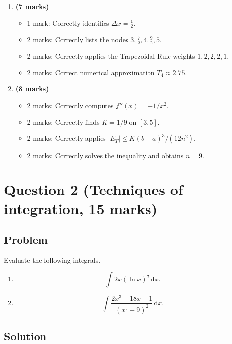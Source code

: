 \documentclass[12pt]{article}
\newcommand{\dd}{\,\mathrm{d}}
\begin{document}
\begin{enumerate}[label=(\alph*)]
\item \textbf{(7 marks)}
\begin{itemize}
\item 1 mark: Correctly identifies $\Delta x=\frac12$.
\item 2 marks: Correctly lists the nodes $3,\frac72,4,\frac92,5$.
\item 2 marks: Correctly applies the Trapezoidal Rule weights $1,2,2,2,1$.
\item 2 marks: Correct numerical approximation $T_4\approx 2.75$.
\end{itemize}

\item \textbf{(8 marks)}
\begin{itemize}
\item 2 marks: Correctly computes $f''(x)=-1/x^2$.
\item 2 marks: Correctly finds $K=1/9$ on $[3,5]$.
\item 2 marks: Correctly applies $|E_T|\le K(b-a)^3/(12n^2)$.
\item 2 marks: Correctly solves the inequality and obtains $n=9$.
\end{itemize}
\end{enumerate}


\newpage
\section{Question 2 (Techniques of integration, 15 marks)}

\subsection{Problem}

Evaluate the following integrals.

\begin{enumerate}[label=(\alph*)]
\item
\[
\int 2x(\ln x)^2\dd x.
\]

\item
\[
\int \frac{2x^3+18x-1}{(x^2+9)^2}\dd x.
\]
\end{enumerate}




\bigskip
\subsection{Solution}
\end{document}
